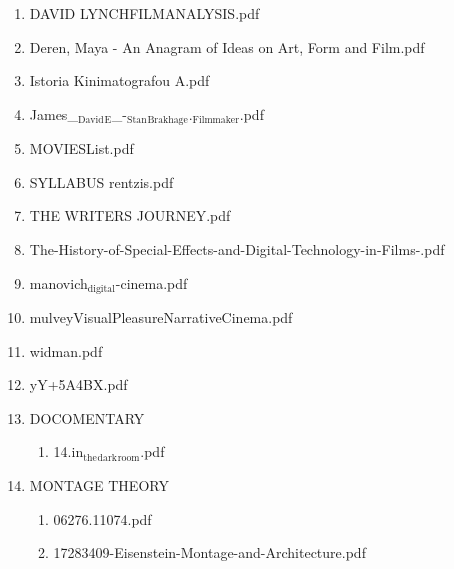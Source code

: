 \documentclass[11pt]{article}
\begin{document}
\begin{enumerate}
\begin{enumerate}
\begin{enumerate}
\begin{enumerate}
\begin{enumerate}
\item DAVID LYNCHFILMANALYSIS.pdf
\label{sec-1-1-1-1-7-3-26-7}

\item Deren, Maya - An Anagram of Ideas on Art, Form and Film.pdf
\label{sec-1-1-1-1-7-3-26-8}

\item Istoria Kinimatografou A.pdf
\label{sec-1-1-1-1-7-3-26-9}

\item James\_$_{\text{David}}$$_{\text{E}}$\_-$_{\text{Stan}}$$_{\text{Brakhage}}$.$_{\text{Filmmaker}}$.pdf
\label{sec-1-1-1-1-7-3-26-10}

\item MOVIESList.pdf
\label{sec-1-1-1-1-7-3-26-11}

\item SYLLABUS rentzis.pdf
\label{sec-1-1-1-1-7-3-26-12}

\item THE WRITERS JOURNEY.pdf
\label{sec-1-1-1-1-7-3-26-13}

\item The-History-of-Special-Effects-and-Digital-Technology-in-Films-.pdf
\label{sec-1-1-1-1-7-3-26-14}

\item manovich$_{\text{digital}}$-cinema.pdf
\label{sec-1-1-1-1-7-3-26-15}

\item mulveyVisualPleasureNarrativeCinema.pdf
\label{sec-1-1-1-1-7-3-26-16}

\item widman.pdf
\label{sec-1-1-1-1-7-3-26-17}

\item yY+5A4BX.pdf
\label{sec-1-1-1-1-7-3-26-18}

\item DOCOMENTARY
\label{sec-1-1-1-1-7-3-26-19}
\begin{enumerate}
\item 14.in$_{\text{the}}$$_{\text{dark}}$$_{\text{room}}$.pdf
\label{sec-1-1-1-1-7-3-26-19-1}
\end{enumerate}

\item MONTAGE THEORY
\label{sec-1-1-1-1-7-3-26-20}
\begin{enumerate}
\item 06276.11074.pdf
\label{sec-1-1-1-1-7-3-26-20-1}

\item 17283409-Eisenstein-Montage-and-Architecture.pdf
\label{sec-1-1-1-1-7-3-26-20-2}


\end{enumerate}
\end{enumerate}
\end{enumerate}
\end{enumerate}
\end{enumerate}
\end{enumerate}
\end{document}

